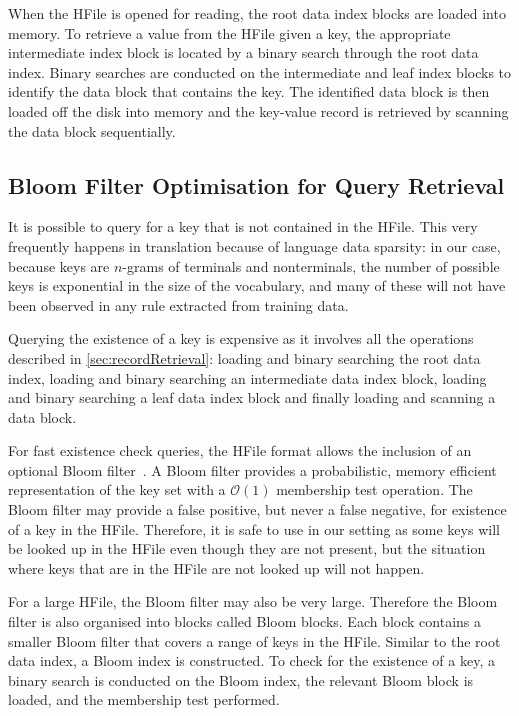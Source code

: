 When the HFile is opened for reading, the root data index blocks are loaded into memory.
To retrieve a value from the HFile given a key, the appropriate intermediate
index block is located by a binary search through the root data index. Binary
searches are conducted on the intermediate and leaf index blocks to identify the
data block that contains the key. The identified data block is then loaded off the disk
into memory and the key-value record is retrieved by scanning the data block
sequentially.

\subsection{Bloom Filter Optimisation for Query Retrieval}
\label{sec:bloomFilterOptimization}

It is possible to query for a key that is not contained in the HFile. This very
frequently happens in translation because of language data sparsity: in our case,
because keys are $n$-grams of terminals and nonterminals, the number of possible
keys is exponential in the size of the vocabulary, and many of these
will not have been observed in any rule extracted from training data.

Querying
the existence of a key is expensive as it involves all the operations
described in \autoref{sec:recordRetrieval}: loading and binary
searching the root data index,
loading and binary searching an intermediate data index block,
loading and binary searching
a leaf data index block and finally loading and scanning a data block.

For fast existence check queries, the HFile format allows
the inclusion of an optional Bloom filter~\citep{bloom:1970:ACM}. A Bloom filter
provides a probabilistic, memory efficient representation of the key set with a
$\mathcal{O}(1)$ membership test operation. The Bloom filter may provide a false
positive, %
but never a false negative, for existence of a key in the HFile.
Therefore, it is safe to use in our setting as some keys will be looked
up in the HFile even though they are not present, but the situation
where keys that are in the HFile are not looked up will not happen.

For a large
HFile, the Bloom filter may also be very large. Therefore the  Bloom filter is
also organised into blocks called Bloom blocks. Each block contains a smaller
Bloom filter that covers a range of keys in the HFile. Similar to the root data
index, a Bloom index is constructed. To check for the
existence of a key, a binary search is conducted on the Bloom index, the
relevant Bloom block is loaded, and the membership test performed.

